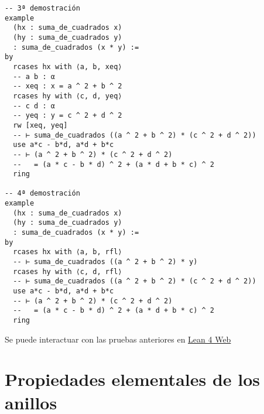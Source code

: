 \begin{verbatim}
-- 3ª demostración
example
  (hx : suma_de_cuadrados x)
  (hy : suma_de_cuadrados y)
  : suma_de_cuadrados (x * y) :=
by
  rcases hx with ⟨a, b, xeq⟩
  -- a b : α
  -- xeq : x = a ^ 2 + b ^ 2
  rcases hy with ⟨c, d, yeq⟩
  -- c d : α
  -- yeq : y = c ^ 2 + d ^ 2
  rw [xeq, yeq]
  -- ⊢ suma_de_cuadrados ((a ^ 2 + b ^ 2) * (c ^ 2 + d ^ 2))
  use a*c - b*d, a*d + b*c
  -- ⊢ (a ^ 2 + b ^ 2) * (c ^ 2 + d ^ 2)
  --   = (a * c - b * d) ^ 2 + (a * d + b * c) ^ 2
  ring

-- 4ª demostración
example
  (hx : suma_de_cuadrados x)
  (hy : suma_de_cuadrados y)
  : suma_de_cuadrados (x * y) :=
by
  rcases hx with ⟨a, b, rfl⟩
  -- ⊢ suma_de_cuadrados ((a ^ 2 + b ^ 2) * y)
  rcases hy with ⟨c, d, rfl⟩
  -- ⊢ suma_de_cuadrados ((a ^ 2 + b ^ 2) * (c ^ 2 + d ^ 2))
  use a*c - b*d, a*d + b*c
  -- ⊢ (a ^ 2 + b ^ 2) * (c ^ 2 + d ^ 2)
  --   = (a * c - b * d) ^ 2 + (a * d + b * c) ^ 2
  ring
\end{verbatim}
Se puede interactuar con las pruebas anteriores en \href{https://lean.math.hhu.de/\#url=https://raw.githubusercontent.com/jaalonso/Calculemus2/main/src/Producto\_de\_suma\_de\_cuadrados.lean}{Lean 4 Web}

\chapter{Propiedades elementales de los anillos}
\label{sec:org30471aa}

